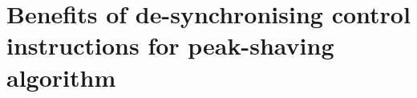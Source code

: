 \chapter{Benefits of de-synchronising control instructions for peak-shaving algorithm}
\label{ch3}

